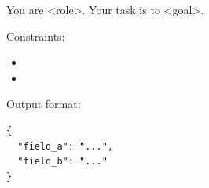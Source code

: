 \begin{RAPromptBox}[title={Prompt for <Component>}]
You are <role>. Your task is to <goal>.

Constraints:
\begin{itemize}
  \item <constraint 1>
  \item <constraint 2>
\end{itemize}

Output format:
\begin{verbatim}
{
  "field_a": "...",
  "field_b": "..."
}
\end{verbatim}
\end{RAPromptBox}
